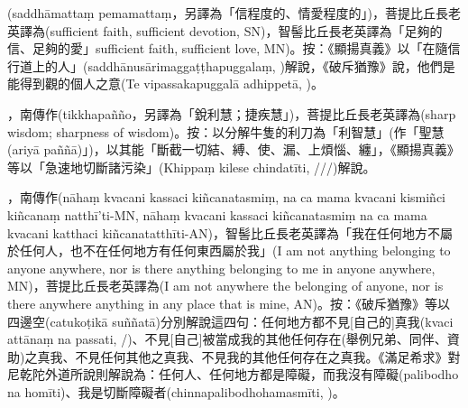 \startitemgroup[noteitems]
\item{}(saddhāmattaṃ pemamattaṃ，另譯為「信程度的、情愛程度的」)，菩提比丘長老英譯為(sufficient faith, sufficient devotion, SN)，智髻比丘長老英譯為「足夠的信、足夠的愛」sufficient faith, sufficient love, MN)。按：《顯揚真義》以「在隨信行道上的人」(saddhānusārimaggaṭṭhapuggalaṃ, )解說，《破斥猶豫》說，他們是能得到觀的個人之意(Te vipassakapuggalā adhippetā, )。
\stopitemgroup

\startitemgroup[noteitems]
\item{}，南傳作(tikkhapañño，另譯為「銳利慧；捷疾慧」)，菩提比丘長老英譯為(sharp wisdom; sharpness of wisdom)。按：以分解牛隻的利刀為「利智慧」(作「聖慧(ariyā paññā)」)，以其能「斷截一切結、縛、使、漏、上煩惱、纏」，《顯揚真義》等以「急速地切斷諸污染」(Khippaṃ kilese chindatīti, ///)解說。
\stopitemgroup

\startitemgroup[noteitems]
\item{}，南傳作(nāhaṃ kvacani kassaci kiñcanatasmiṃ, na ca mama kvacani kismiñci kiñcanaṃ natthī'ti-MN, nāhaṃ kvacani kassaci kiñcanatasmiṃ na ca mama kvacani katthaci kiñcanatatthīti-AN)，智髻比丘長老英譯為「我在任何地方不屬於任何人，也不在任何地方有任何東西屬於我」(I am not anything belonging to anyone anywhere, nor is there anything belonging to me in anyone anywhere, MN)，菩提比丘長老英譯為(I am not anywhere the belonging of anyone, nor is there anywhere anything in any place that is mine, AN)。按：《破斥猶豫》等以四邊空(catukoṭikā suññatā)分別解說這四句：任何地方都不見[自己的]真我(kvaci attānaṃ na passati, /)、不見[自己]被當成我的其他任何存在(舉例兄弟、同伴、資助)之真我、不見任何其他之真我、不見我的其他任何存在之真我。《滿足希求》對尼乾陀外道所說則解說為：任何人、任何地方都是障礙，而我沒有障礙(palibodho na homīti)、我是切斷障礙者(chinnapalibodhohamasmīti, )。
\stopitemgroup

